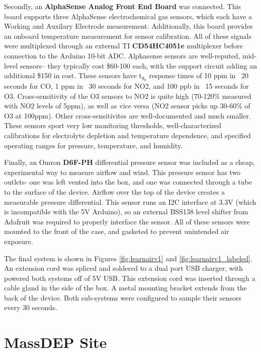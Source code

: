 Secondly, an \textbf{AlphaSense Analog Front End Board} was connected.  This board supports three AlphaSense electrochemical gas sensors, which each have a Working and Auxilary Electrode measurement.  Additionally, this board provides an onboard temperature measurement for sensor calibration.  All of these signals were multiplexed through an external TI \textbf{CD54HC4051e} multiplexer before connection to the Arduino 10-bit ADC.  Alphasense sensors are well-reputed, mid-level sensors-- they typically cost \$60-100 each, with the support circuit adding an additional \$150 in cost.  These sensors have t$_9_0$ response times of 10 ppm in ~20 seconds for CO, 1 ppm in ~30 seconds for NO2, and 100 ppb in ~15 seconds for O3.  Cross-sensitivity of the O3 sensors to NO2 is quite high (70-120\% measured with NO2 levels of 5ppm), as well as vice versa (NO2 sensor picks up 30-60\% of O3 at 100ppm).  Other cross-sensitivites are well-documented and much smaller.  These sensors sport very low monitoring thresholds, well-characterized calibrations for electrolyte depletion and temperature dependence, and specified operating ranges for pressure, temperature, and humidity.

Finally, an Omron \textbf{D6F-PH} differential pressure sensor was included as a cheap, experimental way to measure airflow and wind.  This pressure sensor has two outlets- one was left vented into the box, and one was connected through a tube to the surface of the device.  Airflow over the top of the device creates a measurable pressure differential.  This sensor runs an I2C interface at 3.3V (which is incompatible with the 5V Arduino), so an external BSS138 level shifter from Adafruit was required to properly interface the sensor.  All of these sensors were mounted to the front of the case, and gasketed to prevent unintended air exposure.

The final system is shown in Figures \ref{fig:learnairv1} and \ref{fig:learnairv1_labeled}.  An extension cord was spliced and soldered to a dual port USB charger, with powered both systems off of 5V USB.  This extension cord was inserted through a cable gland in the side of the box.  A metal mounting bracket extends from the back of the device.  Both sub-systems were configured to sample their sensors every 30 seconds.




\section{MassDEP Site}

